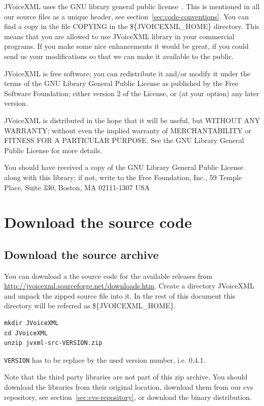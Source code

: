 \documentclass[11pt,a4paper]{article}
\begin{document}
JVoiceXML uses the GNU library general public license~\cite{gnu:lgpg}. 
This is mentioned in all our source files as a unique header, see
section~\ref{sec:code-conventions}.
You can find a copy in the file COPYING in the \$\{JVOICEXML\_HOME\}
directory. This means that you are allowed to use JVoiceXML
library in your commercial programs. If you make some nice
enhancements it would be great, if you could send us your
modifications so that we can make it available to the public.

JVoiceXML is free software; you can redistribute it and/or
modify it under the terms of the GNU Library General Public
License as published by the Free Software Foundation; either
version 2 of the License, or (at your option) any later version.

JVoiceXML is distributed in the hope that it will be useful,
but WITHOUT ANY WARRANTY; without even the implied warranty of
MERCHANTABILITY or FITNESS FOR A PARTICULAR PURPOSE. See the GNU
Library General Public License for more details.

You should have received a copy of the GNU Library General Public
License along with this library; if not, write to the Free
Foundation, Inc., 59 Temple Place, Suite 330, Boston, MA  02111-1307  USA

\section{Download the source code}

\subsection{Download the source archive}

You can download a the source code for the available releases from 
\url{http://jvoicexml.sourceforge.net/downloads.htm}.
Create a directory JVoice\-XML and unpack the zipped source file into it.
In the rest of this document this directory will be referred as
\$\{JVOICE\-XML\_HOME\}.

\begin{lstlisting}
mkdir JVoiceXML
cd JVoiceXML
unzip jvxml-src-VERSION.zip
\end{lstlisting}

\texttt{VERSION} has to be replace by the used version number, i.e. 0.4.1.

Note that the third party libraries are not part of this zip archive.
You should download the libraries from their original location,
download them from our cvs repository, see 
section~\ref{sec:cvs-repository}, or download the binary distribution.
\end{document}
